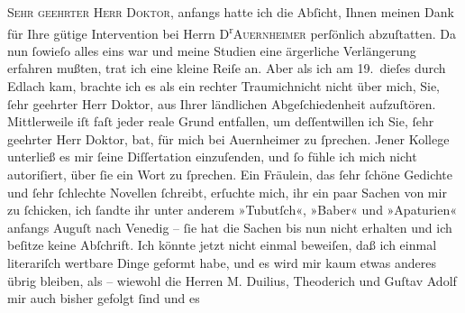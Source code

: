 \pstart{}\textsc{Sehr geehrter Herr Doktor,}\pend\vspace{0.5em}
\pstart
           anfangs hatte ich die Abſicht, Ihnen meinen Dank für Ihre gütige Intervention bei
               Herrn D\textsuperscript{r}\textsc{Auernheimer} perſönlich abzuſtatten. Da nun ſowieſo alles eins war und meine Studien eine
               ärgerliche Verlängerung erfahren mußten, trat ich eine kleine Reiſe an. Aber als ich
               am 19. dieſes durch Edlach kam,
               brachte ich es als ein rechter Traumichnicht nicht {\pb}über mich, Sie, ſehr geehrter Herr Doktor,
               aus Ihrer ländlichen Abgeſchiedenheit aufzuſtören. Mittlerweile iſt faſt jeder reale
               Grund entfallen, um deſſentwillen ich Sie, ſehr geehrter Herr Doktor, bat, für mich
               bei Auernheimer zu ſprechen. Jener Kollege unterließ es mir
               ſeine Diſſertation
               einzuſenden, und ſo fühle ich mich nicht autoriſiert, über ſie ein Wort zu ſprechen.
               Ein Fräulein, das ſehr ſchöne Gedichte und ſehr ſchlechte Novellen ſchreibt, erſuchte
               mich, ihr ein paar Sachen von mir {\pb}zu
               ſchicken, ich ſandte ihr unter anderem »Tubutſch«, »Baber« und »Apaturien« anfangs Auguſt nach Venedig – ſie hat die Sachen bis nun nicht
               erhalten und ich beſitze keine Abſchrift. Ich könnte jetzt nicht einmal beweiſen, daß
               ich einmal literariſch wertbare Dinge geformt habe, und es wird mir kaum etwas
               anderes übrig bleiben, als – wiewohl die Herren M.
                  Duilius, Theoderich und Guſtav Adolf mir auch bisher gefolgt ſind und es
